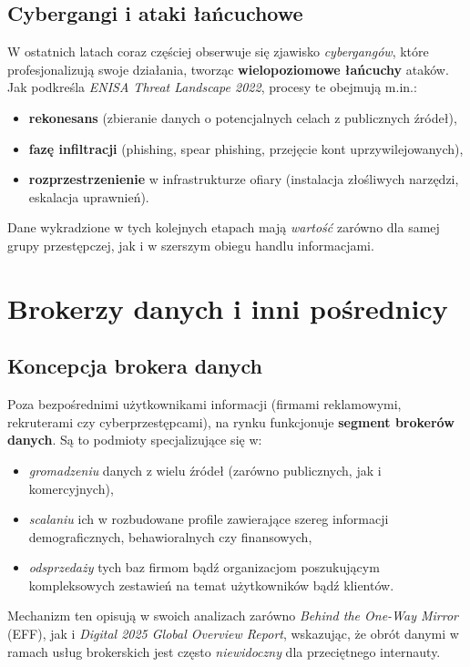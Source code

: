 \subsection{Cybergangi i ataki łańcuchowe}
W ostatnich latach coraz częściej obserwuje się zjawisko \emph{cybergangów}, które profesjonalizują swoje działania, tworząc \textbf{wielopoziomowe łańcuchy} ataków. Jak podkreśla \emph{ENISA Threat Landscape 2022}, procesy te obejmują m.in.:
\begin{itemize}
    \item \textbf{rekonesans} (zbieranie danych o potencjalnych celach z publicznych źródeł),
    \item \textbf{fazę infiltracji} (phishing, spear phishing, przejęcie kont uprzywilejowanych),
    \item \textbf{rozprzestrzenienie} w infrastrukturze ofiary (instalacja złośliwych narzędzi, eskalacja uprawnień).
\end{itemize}
Dane wykradzione w tych kolejnych etapach mają \emph{wartość} zarówno dla samej grupy przestępczej, jak i w szerszym obiegu handlu informacjami.

\vspace{1em}

\section{Brokerzy danych i inni pośrednicy}

\subsection{Koncepcja brokera danych}
Poza bezpośrednimi użytkownikami informacji (firmami reklamowymi, rekruterami czy cyberprzestępcami), na rynku funkcjonuje \textbf{segment brokerów danych}. Są to podmioty specjalizujące się w:
\begin{itemize}
    \item \emph{gromadzeniu} danych z wielu źródeł (zarówno publicznych, jak i komercyjnych),
    \item \emph{scalaniu} ich w rozbudowane profile zawierające szereg informacji demograficznych, behawioralnych czy finansowych,
    \item \emph{odsprzedaży} tych baz firmom bądź organizacjom poszukującym kompleksowych zestawień na temat użytkowników bądź klientów.
\end{itemize}
Mechanizm ten opisują w swoich analizach zarówno \emph{Behind the One-Way Mirror} (EFF), jak i \emph{Digital 2025 Global Overview Report}, wskazując, że obrót danymi w ramach usług brokerskich jest często \emph{niewidoczny} dla przeciętnego internauty.

